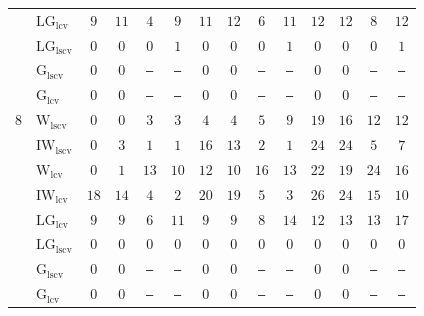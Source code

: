 \begin{table}[!htp]
\begin{tabular}{clcccccccccccc}
 & $\mathrm{LG}_{\mathrm{lcv}}$ & \cellcolor{black!10}$9$ & \cellcolor{black!10}$11$ & $4$ & \cellcolor{black!30}$9$ & $11$ & $12$ & $6$ & \cellcolor{black!10}$11$ & $12$ & $12$ & $8$ & $12$ \\
 & $\mathrm{LG}_{\mathrm{lscv}}$ & $0$ & $0$ & $0$ & $1$ & $0$ & $0$ & $0$ & $1$ & $0$ & $0$ & $0$ & $1$ \\
 & $\mathrm{G}_{\mathrm{lscv}}$ & $0$ & $0$ & \texttt{---} & \texttt{---} & $0$ & $0$ & \texttt{---} & \texttt{---} & $0$ & $0$ & \texttt{---} & \texttt{---} \\
 & $\mathrm{G}_{\mathrm{lcv}}$ & $0$ & $0$ & \texttt{---} & \texttt{---} & $0$ & $0$ & \texttt{---} & \texttt{---} & $0$ & $0$ & \texttt{---} & \texttt{---} \\
\midrule
$8$ & $\mathrm{W}_{\mathrm{lscv}}$ & $0$ & $0$ & $3$ & $3$ & $4$ & $4$ & $5$ & $9$ & $19$ & $16$ & $12$ & $12$ \\
 & $\mathrm{IW}_{\mathrm{lscv}}$ & $0$ & $3$ & $1$ & $1$ & \cellcolor{black!10}$16$ & \cellcolor{black!10}$13$ & $2$ & $1$ & \cellcolor{black!10}$24$ & \cellcolor{black!30}$24$ & $5$ & $7$ \\
 & $\mathrm{W}_{\mathrm{lcv}}$ & $0$ & $1$ & \cellcolor{black!30}$13$ & \cellcolor{black!10}$10$ & $12$ & $10$ & \cellcolor{black!30}$16$ & \cellcolor{black!10}$13$ & $22$ & \cellcolor{black!10}$19$ & \cellcolor{black!30}$24$ & \cellcolor{black!10}$16$ \\
 & $\mathrm{IW}_{\mathrm{lcv}}$ & \cellcolor{black!30}$18$ & \cellcolor{black!30}$14$ & $4$ & $2$ & \cellcolor{black!30}$20$ & \cellcolor{black!30}$19$ & $5$ & $3$ & \cellcolor{black!30}$26$ & \cellcolor{black!30}$24$ & \cellcolor{black!10}$15$ & $10$ \\
 & $\mathrm{LG}_{\mathrm{lcv}}$ & \cellcolor{black!10}$9$ & \cellcolor{black!10}$9$ & \cellcolor{black!10}$6$ & \cellcolor{black!30}$11$ & $9$ & $9$ & \cellcolor{black!10}$8$ & \cellcolor{black!30}$14$ & $12$ & $13$ & $13$ & \cellcolor{black!30}$17$ \\
 & $\mathrm{LG}_{\mathrm{lscv}}$ & $0$ & $0$ & $0$ & $0$ & $0$ & $0$ & $0$ & $0$ & $0$ & $0$ & $0$ & $0$ \\
 & $\mathrm{G}_{\mathrm{lscv}}$ & $0$ & $0$ & \texttt{---} & \texttt{---} & $0$ & $0$ & \texttt{---} & \texttt{---} & $0$ & $0$ & \texttt{---} & \texttt{---} \\
 & $\mathrm{G}_{\mathrm{lcv}}$ & $0$ & $0$ & \texttt{---} & \texttt{---} & $0$ & $0$ & \texttt{---} & \texttt{---} & $0$ & $0$ & \texttt{---} & \texttt{---} \\

\end{tabular}
\end{table}
